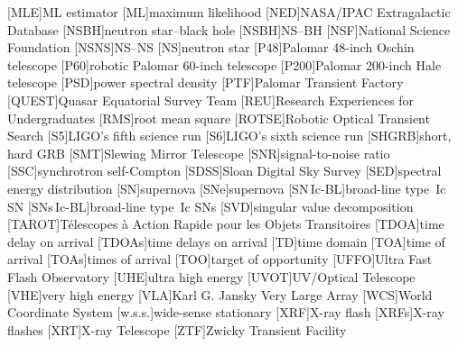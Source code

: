 \begin{acronym}
[MLE]{\ac{ML} estimator}
[ML]{maximum likelihood}
[NED]{NASA/IPAC Extragalactic Database}
[NSBH]{neutron star\nobreakdashes--black hole}
[NSBH]{\acl{NS}\nobreakdashes--\acl{BH}}
[NSF]{National Science Foundation}
[NSNS]{\acl{NS}\nobreakdashes--\acl{NS}}
[NS]{neutron star}
[P48]{Palomar 48\nobreakdashes-inch Oschin telescope}
[P60]{robotic Palomar 60\nobreakdashes-inch telescope}
[P200]{Palomar 200\nobreakdashes-inch Hale telescope}
[PSD]{power spectral density}
[PTF]{Palomar Transient Factory}
[QUEST]{Quasar Equatorial Survey Team}
[REU]{Research Experiences for Undergraduates}
[RMS]{root mean square}
[ROTSE]{Robotic Optical Transient Search}
[S5]{\ac{LIGO}'s fifth science run}
[S6]{\ac{LIGO}'s sixth science run}
[SHGRB]{short, hard \acl{GRB}}
[SMT]{Slewing Mirror Telescope}
[SNR]{signal\nobreakdashes-to\nobreakdashes-noise ratio}
[SSC]{synchrotron self\nobreakdashes-Compton}
[SDSS]{Sloan Digital Sky Survey}
[SED]{spectral energy distribution}
[SN]{supernova}
[SNe]{supernova}
[\acs{SN}\,Ic\nobreakdashes-BL]{broad\nobreakdashes-line type~Ic \ac{SN}}
[\acsp{SN}\,Ic\nobreakdashes-BL]{broad\nobreakdashes-line type~Ic \acp{SN}}
[SVD]{singular value decomposition}
[TAROT]{T\'{e}lescopes \`{a} Action Rapide pour les Objets Transitoires}
[TDOA]{time delay on arrival}
[TDOAs]{time delays on arrival}
[TD]{time domain}
[TOA]{time of arrival}
[TOAs]{times of arrival}
[TOO]{target of opportunity}
[UFFO]{Ultra Fast Flash Observatory}
[UHE]{ultra high energy}
[UVOT]{UV/Optical Telescope}
[VHE]{very high energy}
[VLA]{Karl G. Jansky Very Large Array}
[WCS]{World Coordinate System}
[w.s.s.]{wide\nobreakdashes-sense stationary}
[XRF]{X\nobreakdashes-ray flash}
[XRFs]{X\nobreakdashes-ray flashes}
[XRT]{X\nobreakdashes-ray Telescope}
[ZTF]{Zwicky Transient Facility}
\end{acronym}
